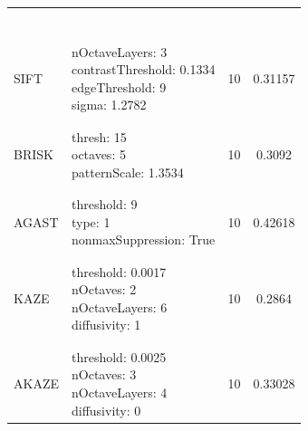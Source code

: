 \documentclass[journal]{IEEEtran}
\begin{document}
\begin{table}
{\begin{minipage}{0.47\textwidth}
\begin{tabular}{lp{3cm}cc}
    & & \\
    & & \\
    & & \\
    & & \\
    & & \\
    & & \\
    & & \\
    \multirow{4}{*}{SIFT} & \multirow{4}{*}{\parbox{3cm}{\raggedright nOctaveLayers: 3\\contrastThreshold: 0.1334\\edgeThreshold: 9\\sigma: 1.2782}} & \multirow{4}{*}{10}  & \multirow{4}{*}{0.31157} \\
    & & \\
    & & \\
    & & \\
    & & \\
    & & \\
    \multirow{3}{*}{BRISK} & \multirow{3}{*}{\parbox{3cm}{\raggedright thresh: 15\\octaves: 5\\patternScale: 1.3534}} & \multirow{3}{*}{10}  & \multirow{3}{*}{0.3092} \\
    & & \\
    & & \\
    & & \\
    & & \\
    \multirow{3}{*}{AGAST} & \multirow{3}{*}{\parbox{3cm}{\raggedright threshold: 9\\type: 1\\nonmaxSuppression: True}} & \multirow{3}{*}{10}  & \multirow{3}{*}{0.42618} \\
    & & \\
    & & \\
    & & \\
    & & \\
    \multirow{4}{*}{KAZE} & \multirow{4}{*}{\parbox{3cm}{\raggedright threshold: 0.0017\\nOctaves: 2\\nOctaveLayers: 6\\diffusivity: 1}} & \multirow{4}{*}{10}  & \multirow{4}{*}{0.2864} \\
    & & \\
    & & \\
    & & \\
    & & \\
    & & \\
    \multirow{4}{*}{AKAZE} & \multirow{4}{*}{\parbox{3cm}{\raggedright threshold: 0.0025\\nOctaves: 3\\nOctaveLayers: 4\\diffusivity: 0}} & \multirow{4}{*}{10}  & \multirow{4}{*}{0.33028} \\

\end{tabular}
\end{minipage}}
\end{table}
\end{document}
